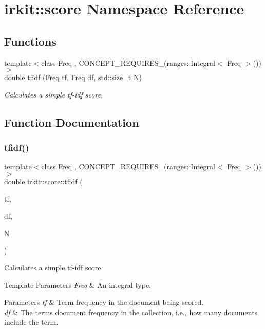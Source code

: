 \hypertarget{namespaceirkit_1_1score}{}\section{irkit\+:\+:score Namespace Reference}
\label{namespaceirkit_1_1score}
\subsection*{Functions}
\begin{DoxyCompactItemize}
\item 
{\footnotesize template$<$class Freq , C\+O\+N\+C\+E\+P\+T\+\_\+\+R\+E\+Q\+U\+I\+R\+E\+S\+\_\+(ranges\+::\+Integral$<$ Freq $>$()) $>$ }\\double \hyperlink{namespaceirkit_1_1score_a2d7234c47ea67229e19640f34ee97e62}{tfidf} (Freq tf, Freq df, std\+::size\+\_\+t N)
\begin{DoxyCompactList}\small\item\em Calculates a simple tf-\/idf score. \end{DoxyCompactList}\end{DoxyCompactItemize}


\subsection{Function Documentation}
\mbox{\label{namespaceirkit_1_1score_a2d7234c47ea67229e19640f34ee97e62}} 
\subsubsection{\texorpdfstring{tfidf()}{tfidf()}}
{\footnotesize\ttfamily template$<$class Freq , C\+O\+N\+C\+E\+P\+T\+\_\+\+R\+E\+Q\+U\+I\+R\+E\+S\+\_\+(ranges\+::\+Integral$<$ Freq $>$()) $>$ \\
double irkit\+::score\+::tfidf (\begin{DoxyParamCaption}\item[{Freq}]{tf,  }\item[{Freq}]{df,  }\item[{std\+::size\+\_\+t}]{N }\end{DoxyParamCaption})}



Calculates a simple tf-\/idf score. 


\begin{DoxyTemplParams}{Template Parameters}
{\em Freq} & An integral type. \\
\hline
\end{DoxyTemplParams}

\begin{DoxyParams}{Parameters}
{\em tf} & Term frequency in the document being scored. \\
\hline
{\em df} & The term\textquotesingle{}s document frequency in the collection, i.\+e., how many documents include the term. \\
\hline
\end{DoxyParams}
